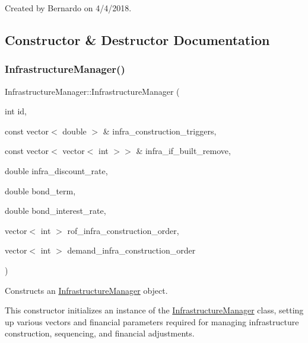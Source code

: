 Created by Bernardo on 4/4/2018. 

\subsection{Constructor \& Destructor Documentation}
\mbox{\label{classInfrastructureManager_a2720f467b660e0f63f265e7957ca0139}} 
\subsubsection{\texorpdfstring{Infrastructure\+Manager()}{InfrastructureManager()}\hspace{0.1cm}{\footnotesize\ttfamily [1/3]}}
{\footnotesize\ttfamily Infrastructure\+Manager\+::\+Infrastructure\+Manager (\begin{DoxyParamCaption}\item[{int}]{id,  }\item[{const vector$<$ double $>$ \&}]{infra\+\_\+construction\+\_\+triggers,  }\item[{const vector$<$ vector$<$ int $>$$>$ \&}]{infra\+\_\+if\+\_\+built\+\_\+remove,  }\item[{double}]{infra\+\_\+discount\+\_\+rate,  }\item[{double}]{bond\+\_\+term,  }\item[{double}]{bond\+\_\+interest\+\_\+rate,  }\item[{vector$<$ int $>$}]{rof\+\_\+infra\+\_\+construction\+\_\+order,  }\item[{vector$<$ int $>$}]{demand\+\_\+infra\+\_\+construction\+\_\+order }\end{DoxyParamCaption})}



Constructs an \mbox{\hyperlink{classInfrastructureManager}{Infrastructure\+Manager}} object. 

This constructor initializes an instance of the {\ttfamily \mbox{\hyperlink{classInfrastructureManager}{Infrastructure\+Manager}}} class, setting up various vectors and financial parameters required for managing infrastructure construction, sequencing, and financial adjustments.


